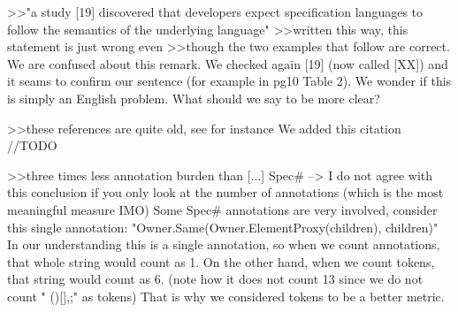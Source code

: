 >>"a study [19] discovered that developers expect specification languages to follow the semantics of the underlying language"
>>written this way, this statement is just wrong even
>>though the two examples that follow are correct.
We are confused about this remark. We checked again [19] (now called [XX]) and it seams to confirm our sentence (for example in pg10 Table 2).
We wonder if this is simply an English problem. What should we say to be more clear?

>>these references are quite old, see for instance
We added this citation
//TODO

>>three times less annotation burden than [...] Spec# --> I do not agree with this conclusion if you only look at the number of annotations (which is the most meaningful measure IMO)
Some Spec# annotations are very involved, consider this single annotation:
"Owner.Same(Owner.ElementProxy(children), children)" In our understanding this is a single annotation, so when we count annotations, that whole string would count as 1.
On the other hand, when we count tokens, that string would count as 6.
(note how it does not count 13 since we do not count " ()[]{},;" as tokens)
That is why we considered tokens to be a better metric.

